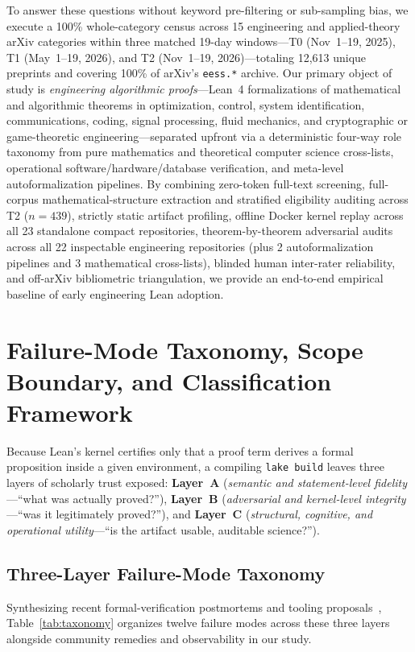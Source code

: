 \documentclass[11pt,letterpaper]{article}
\begin{document}
To answer these questions without keyword pre-filtering or sub-sampling bias, we execute a 100\% whole-category census across 15 engineering and applied-theory arXiv categories within three matched 19-day windows---T0 (Nov~1--19, 2025), T1 (May~1--19, 2026), and T2 (Nov~1--19, 2026)---totaling 12,613 unique preprints and covering 100\% of arXiv's \texttt{eess.*} archive. Our primary object of study is \emph{engineering algorithmic proofs}---Lean~4 formalizations of mathematical and algorithmic theorems in optimization, control, system identification, communications, coding, signal processing, fluid mechanics, and cryptographic or game-theoretic engineering---separated upfront via a deterministic four-way role taxonomy from pure mathematics and theoretical computer science cross-lists, operational software/hardware/database verification, and meta-level autoformalization pipelines. By combining zero-token full-text screening, full-corpus mathematical-structure extraction and stratified eligibility auditing across T2 ($n = 439$), strictly static artifact profiling, offline Docker kernel replay across all 23 standalone compact repositories, theorem-by-theorem adversarial audits across all 22 inspectable engineering repositories (plus 2 autoformalization pipelines and 3 mathematical cross-lists), blinded human inter-rater reliability, and off-arXiv bibliometric triangulation, we provide an end-to-end empirical baseline of early engineering Lean adoption.

\section{Failure-Mode Taxonomy, Scope Boundary, and Classification Framework}
\label{sec:taxonomy}

Because Lean's kernel certifies only that a proof term derives a formal proposition inside a given environment, a compiling \texttt{lake build} leaves three layers of scholarly trust exposed: \textbf{Layer~A} (\emph{semantic and statement-level fidelity}---``what was actually proved?''), \textbf{Layer~B} (\emph{adversarial and kernel-level integrity}---``was it legitimately proved?''), and \textbf{Layer~C} (\emph{structural, cognitive, and operational utility}---``is the artifact usable, auditable science?'').

\subsection{Three-Layer Failure-Mode Taxonomy}
Synthesizing recent formal-verification postmortems and tooling proposals~\cite{bastounis2026navier,zhu2026leanarchitect,paglieri2026swarms,leanatlas2026,axle2026,proofbridge2025}, Table~\ref{tab:taxonomy} organizes twelve failure modes across these three layers alongside community remedies and observability in our study.
\end{document}
